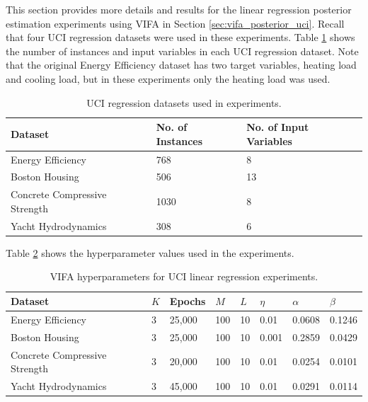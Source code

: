 \documentclass[msc,deptreport.inf]{infthesis} %
\begin{document}
This section provides more details and results for the linear regression posterior estimation experiments using VIFA in Section \ref{sec:vifa_posterior_uci}. Recall that four UCI regression datasets were used in these experiments. Table \ref{table:uci_datasets} shows the number of instances and input variables in each UCI regression dataset. Note that the original Energy Efficiency dataset has two target variables, heating load and cooling load, but in these experiments only the heating load was used. 
\begin{table}[h!]
	\begin{center}
		\begin{tabular}{@{} lll @{}} 
			\toprule
 			Dataset & No. of Instances & No. of Input Variables \\
			\midrule
			Energy Efficiency 				& 768 	& 8 \\
 			Boston Housing 				& 506 	& 13 \\ 
 			Concrete Compressive Strength 	& 1030 	& 8 \\
 			Yacht Hydrodynamics 			& 308 	& 6 \\ 
 			\bottomrule
		\end{tabular}
		\caption{UCI regression datasets used in experiments.}
		\label{table:uci_datasets}
	\end{center}
\end{table}

Table \ref{table:vifa_uci_hyperparameters} shows the hyperparameter values used in the experiments.
\begin{table}[h!]
	\begin{center}
		\begin{tabular}{@{} llllllll @{}} 
			\toprule
 			Dataset & $K$ & Epochs & $M$ & $L$ & $\eta$ & $\alpha$ & $\beta$ \\
			\midrule
			Energy Efficiency 				& 3 & 25,000 & 100 & 10 	& 0.01 	& 0.0608 & 0.1246 \\ 
			Boston Housing 				& 3 & 25,000 & 100 & 10 	& 0.001 	& 0.2859 & 0.0429 \\
 			Concrete Compressive Strength	& 3 & 20,000 & 100 & 10 	& 0.01 	& 0.0254 & 0.0101 \\
 			Yacht Hydrodynamics 			& 3 & 45,000 & 100 & 10 	& 0.01 	& 0.0291 & 0.0114 \\
 			\bottomrule
		\end{tabular}
		\caption{VIFA hyperparameters for UCI linear regression experiments.}
		\label{table:vifa_uci_hyperparameters}
	\end{center}
\end{table}
\end{document}
